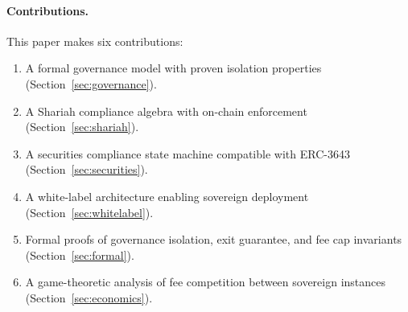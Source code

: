 \paragraph{Contributions.} This paper makes six contributions:
\begin{enumerate}[nosep]
  \item A formal governance model with proven isolation properties (Section~\ref{sec:governance}).
  \item A Shariah compliance algebra with on-chain enforcement (Section~\ref{sec:shariah}).
  \item A securities compliance state machine compatible with ERC-3643~\cite{erc3643} (Section~\ref{sec:securities}).
  \item A white-label architecture enabling sovereign deployment (Section~\ref{sec:whitelabel}).
  \item Formal proofs of governance isolation, exit guarantee, and fee cap invariants (Section~\ref{sec:formal}).
  \item A game-theoretic analysis of fee competition between sovereign instances (Section~\ref{sec:economics}).
\end{enumerate}

